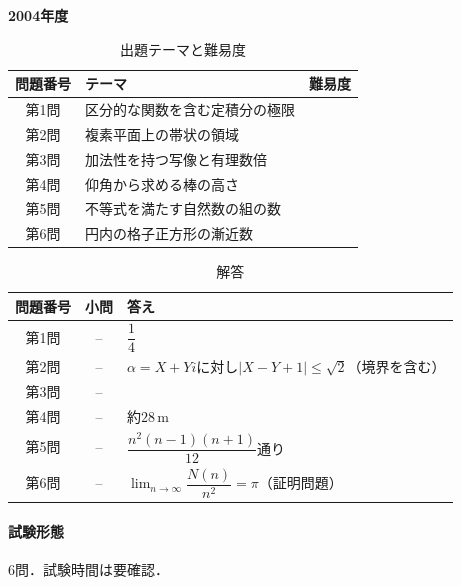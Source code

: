 \documentclass[../../main.tex]{subfiles}
\begin{document}
\begin{center}
  {\fontsize{48pt}{58pt}\selectfont \textbf{2004}\normalsize\textbf{年度}}
\end{center}

\begin{table}[htb]
  \centering
  \caption{出題テーマと難易度}
  \begin{tabular}{|c|p{9cm}|c|}
    \hline
    \textbf{問題番号} & \textbf{テーマ} & \textbf{難易度} \\
    \hline
    第1問 & 区分的な関数を含む定積分の極限 & \\
    \hline
    第2問 & 複素平面上の帯状の領域 & \\
    \hline
    第3問 & 加法性を持つ写像と有理数倍 & \\
    \hline
    第4問 & 仰角から求める棒の高さ & \\
    \hline
    第5問 & 不等式を満たす自然数の組の数 & \\
    \hline
    第6問 & 円内の格子正方形の漸近数 & \\
    \hline
  \end{tabular}
\end{table}

\begin{table}[htb]
  \centering
  \caption{解答}
  \renewcommand{\arraystretch}{1.4}
  \begin{tabular}{|c|c|p{9cm}|}
    \hline
    \textbf{問題番号} & \textbf{小問} & \textbf{答え} \\
    \hline
    第1問 & -- & $\dfrac{1}{4}$ \\
    \hline
    第2問 & -- & $\alpha=X+Yi$に対し$|X-Y+1|\le\sqrt{2}$（境界を含む） \\
    \hline
    第3問 & -- &  \\
    \hline
    第4問 & -- & 約$28\,\mathrm{m}$ \\
    \hline
    第5問 & -- & $\dfrac{n^2(n-1)(n+1)}{12}$通り \\
    \hline
    第6問 & -- & $\displaystyle\lim_{n\to\infty}\dfrac{N(n)}{n^2}=\pi$（証明問題） \\
    \hline
  \end{tabular}
\end{table}

\paragraph{試験形態}
6問．試験時間は要確認．
\end{document}
